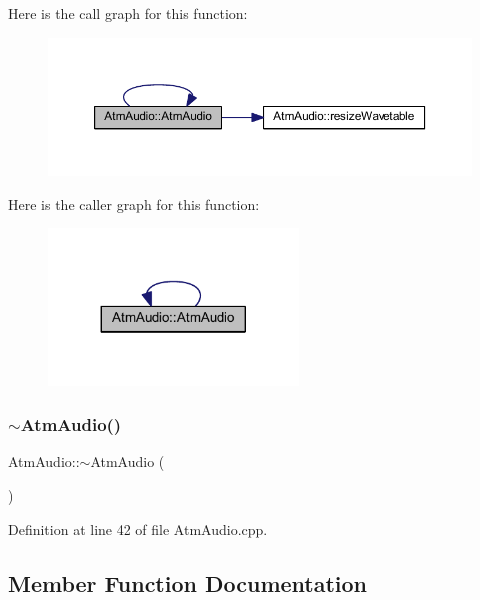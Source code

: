 Here is the call graph for this function\+:
\nopagebreak
\begin{figure}[H]
\begin{center}
\leavevmode
\includegraphics[width=350pt]{d2/de6/class_atm_audio_adef4ded5a0c213fe421025e17de0605e_cgraph}
\end{center}
\end{figure}
Here is the caller graph for this function\+:
\nopagebreak
\begin{figure}[H]
\begin{center}
\leavevmode
\includegraphics[width=188pt]{d2/de6/class_atm_audio_adef4ded5a0c213fe421025e17de0605e_icgraph}
\end{center}
\end{figure}
\mbox{\label{class_atm_audio_ad4d285853a6790f23fd8dd24998a830b}} 
\subsubsection{\texorpdfstring{$\sim$\+Atm\+Audio()}{~AtmAudio()}}
{\footnotesize\ttfamily Atm\+Audio\+::$\sim$\+Atm\+Audio (\begin{DoxyParamCaption}{ }\end{DoxyParamCaption})}



Definition at line 42 of file Atm\+Audio.\+cpp.



\subsection{Member Function Documentation}
\mbox{\label{class_atm_audio_a9336911a6a8dd22d4030b0457270c242}} 
